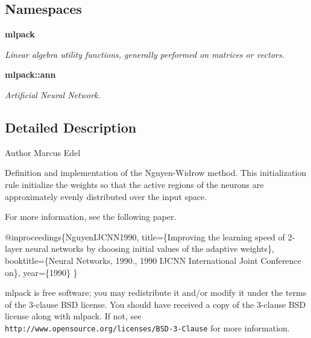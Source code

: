 \subsection*{Namespaces}
\begin{DoxyCompactItemize}
\item 
 \textbf{ mlpack}
\begin{DoxyCompactList}\small\item\em Linear algebra utility functions, generally performed on matrices or vectors. \end{DoxyCompactList}\item 
 \textbf{ mlpack\+::ann}
\begin{DoxyCompactList}\small\item\em Artificial Neural Network. \end{DoxyCompactList}\end{DoxyCompactItemize}


\subsection{Detailed Description}
\begin{DoxyAuthor}{Author}
Marcus Edel
\end{DoxyAuthor}
Definition and implementation of the Nguyen-\/\+Widrow method. This initialization rule initialize the weights so that the active regions of the neurons are approximately evenly distributed over the input space.

For more information, see the following paper.


\begin{DoxyCode}
@inproceedings\{NguyenIJCNN1990,
  title=\{Improving the learning speed of 2-layer neural networks by choosing
  initial values of the adaptive weights\},
  booktitle=\{Neural Networks, 1990., 1990 IJCNN International Joint
  Conference on\},
  year=\{1990\}
\}
\end{DoxyCode}


mlpack is free software; you may redistribute it and/or modify it under the terms of the 3-\/clause B\+SD license. You should have received a copy of the 3-\/clause B\+SD license along with mlpack. If not, see {\tt http\+://www.\+opensource.\+org/licenses/\+B\+S\+D-\/3-\/\+Clause} for more information. 